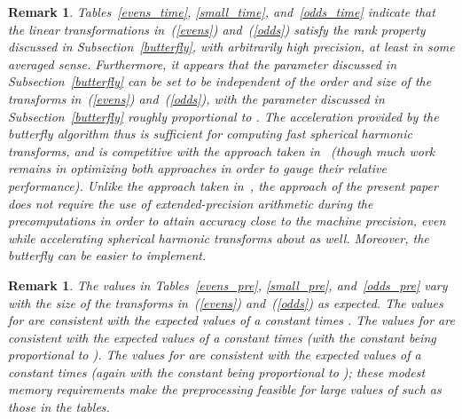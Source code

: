 \documentclass[final,3p,times]{elsarticle}
\newtheorem{remark1}[theorem]{Remark}
\newenvironment{remark}{\begin{remark1}\rm}{\end{remark1}}
\begin{document}
\begin{remark}
\label{empirical_rank}
Tables~\ref{evens_time}, \ref{small_time}, and~\ref{odds_time}
indicate that the linear transformations in~(\ref{evens}) and~(\ref{odds})
satisfy the rank property discussed in Subsection~\ref{butterfly},
with arbitrarily high precision, at least in some averaged sense.
Furthermore, it appears that the parameter  discussed
in Subsection~\ref{butterfly} can be set to be independent
of the order  and size  of the transforms in~(\ref{evens})
and~(\ref{odds}), with the parameter  discussed
in Subsection~\ref{butterfly} roughly proportional to .
The acceleration provided by the butterfly algorithm thus
is sufficient for computing fast spherical harmonic transforms,
and is competitive with the approach taken in~\cite{tygert_sph}
(though much work remains in optimizing both approaches
in order to gauge their relative performance).
Unlike the approach taken in~\cite{tygert_sph},
the approach of the present paper does not require the use
of extended-precision arithmetic during the precomputations
in order to attain accuracy close to the machine precision,
even while accelerating spherical harmonic transforms about as well.
Moreover, the butterfly can be easier to implement.
\end{remark}

\begin{remark}
The values in Tables~\ref{evens_pre}, \ref{small_pre}, and~\ref{odds_pre}
vary with the size  of the transforms in~(\ref{evens}) and~(\ref{odds})
as expected.
The values for 
are consistent with the expected values of a constant times .
The values for 
are consistent with the expected values of a constant times 
(with the constant being proportional to ).
The values for 
are consistent with the expected values of a constant times 
(again with the constant being proportional to );
these modest memory requirements make the preprocessing feasible
for large values of  such as those in the tables.
\end{remark}
\end{document}
